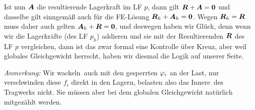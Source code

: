 {Ist nun $\mbox{\boldmath $A$}$ die resultierende Lagerkraft im LF $p$, dann gilt $\mbox{\boldmath $R$} + \mbox{\boldmath $A$} = \mbox{\boldmath $0$}$ und dasselbe gilt sinngem\"{a}{\ss} auch f\"{u}r die FE-L\"{o}sung $\mbox{\boldmath $R$}_h + \mbox{\boldmath $A$}_h = \mbox{\boldmath $0$}$. Wegen $\mbox{\boldmath $R$}_h = \mbox{\boldmath $R$}$ muss daher auch gelten $\mbox{\boldmath $A$}_h + \mbox{\boldmath $R$} = \mbox{\boldmath $0$}$, und deswegen haben wir Gl\"{u}ck, denn wenn wir die Lagerkr\"{a}fte (des LF $p_h$) addieren und sie mit der Resultierenden $\mbox{\boldmath $R$}$ des LF $p$ vergleichen, dann ist das zwar formal eine Kontrolle \"{u}ber Kreuz, aber weil globales Gleichgewicht herrscht, haben wir diesmal die Logik auf unserer Seite.

{\em Anmerkung:\/}
Wir \glq wackeln\grq\ auch mit den gesperrten $\varphi_i$ an der Last, nur verschwinden diese $f_i$ direkt in den Lagern, belasten also \glq das Innere\grq\ des Tragwerks nicht. Sie m\"{u}ssen aber bei dem globalen Gleichgewicht nat\"{u}rlich mitgez\"{a}hlt werden.
} %

